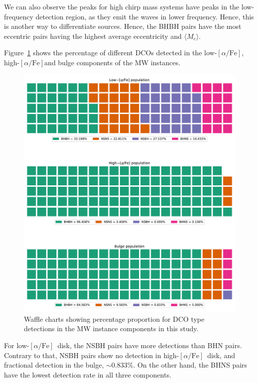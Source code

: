 \documentclass[journal, twocolumn]{IEEEtran}
\newcommand{\lowalpha}{low-$[\alpha/\text{Fe}]$}
\newcommand{\highalpha}{high-$[\alpha/\text{Fe}]$}
\begin{document}
    We can also observe the peaks for high chirp mass systems have peaks in the low-frequency detection region, as they emit the waves in lower frequency.
    Hence, this is another way to differentiate sources.
    Hence, the BHBH pairs have the most eccentric pairs having the highest average eccentricity and $\langle M_c\rangle$.
    

    Figure~\ref{fig:dcotypemwcomponentdistributioncropped} shows the percentage of different DCOs detected in the \lowalpha, \highalpha and bulge components of the MW instances.

    \begin{figure}[!h]%
        \centering
        \includegraphics[width=\columnwidth]{analysis_data/main_analysis_folder/dco_type_MW_component_distribution_cropped}
        \caption{Waffle charts showing percentage proportion for DCO type detections in the MW instance components in this study.}
        \label{fig:dcotypemwcomponentdistributioncropped}
    \end{figure}%
    For \lowalpha\ disk, the NSBH pairs have more detections than BHN pairs.
    Contrary to that, NSBH pairs show no detection in \highalpha\ disk, and fractional detection in the bulge, $\sim0.833\%$.
    On the other hand, the BHNS pairs have the lowest detection rate in all three components.
\end{document}
